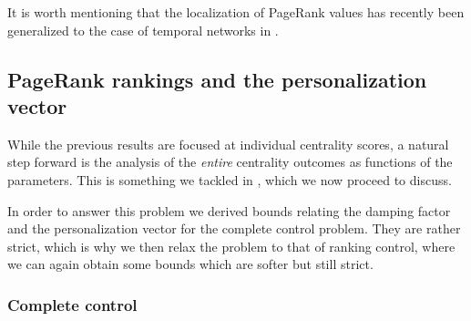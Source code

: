 \documentclass[sn-mathphys-ay]{sn-jnl}%
\newcommand{\R}{\mathbb{R}}
\newcommand{\I}{\mathbb{I}}
\theoremstyle{thmstyleone}%
\newtheorem{theorem}{Theorem}%
\theoremstyle{thmstyletwo}%
\theoremstyle{thmstylethree}%
\begin{document}
%


It is worth mentioning that the localization of PageRank values has recently been generalized to the case of temporal networks in \cite{aleja2024timedependent}.






\subsection{PageRank rankings and the personalization vector}\label{subsec:paramPRcontrol}

While the previous results are focused at individual centrality scores, a natural step forward is the analysis of the \textit{entire} centrality outcomes as functions of the parameters. This is something we tackled in \cite{contrerasaso2023pagerank}, which we now proceed to discuss.


In order to answer this problem we derived bounds relating the damping factor and the personalization vector for the complete control problem. They are rather strict, which is why we then relax the problem to that of ranking control, where we can again obtain some bounds which are softer but still strict.

\subsubsection{Complete control}
\end{document}
